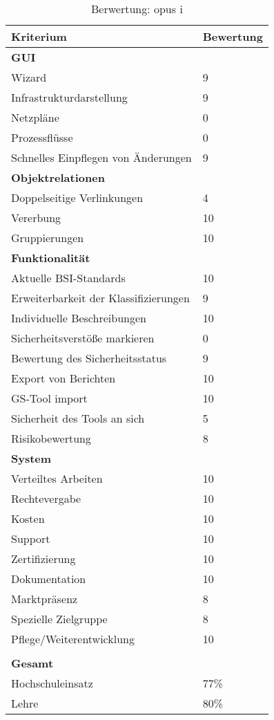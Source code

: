 \begin{table}[h!tb]
	\begin{tabular}{|p{}|p{}|}
		\hline 
		Kriterium & Bewertung\\ 
		\hline 
		\textbf{GUI}& \\
		\hline
		Wizard & 9\\
		\hline 
		Infrastrukturdarstellung & 9 \\
		\hline 
		Netzpläne & 0 \\
		\hline 
		Prozessflüsse & 0 \\
		\hline 
		Schnelles Einpflegen von Änderungen & 9 \\
		\hline
		\textbf{Objektrelationen} & \\
		\hline 
		Doppelseitige Verlinkungen & 4 \\
		\hline 
		Vererbung & 10 \\
		\hline 
		Gruppierungen & 10 \\
		\hline 
		\textbf{Funktionalität} &\\
		\hline 
		Aktuelle BSI-Standards & 10 \\
		\hline  
		Erweiterbarkeit der Klassifizierungen & 9 \\
		\hline 
		Individuelle Beschreibungen & 10 \\
		\hline 
		Sicherheitsverstöße markieren & 0 \\
		\hline
		Bewertung des Sicherheitsstatus & 9 \\
		\hline
		Export von Berichten & 10 \\
		\hline
		GS-Tool import & 10 \\
		\hline
		Sicherheit des Tools an sich & 5 \\
		\hline
		Risikobewertung & 8 \\
		\hline
		\textbf{System}&  \\
		\hline
		Verteiltes Arbeiten & 10 \\
		\hline
		Rechtevergabe & 10 \\
		\hline
		Kosten & 10 \\
		\hline
		Support & 10 \\
		\hline
		Zertifizierung & 10 \\
		\hline
		Dokumentation & 10 \\
		\hline
		Marktpräsenz & 8 \\
		\hline
		Spezielle Zielgruppe & 8 \\
		\hline
		Pflege/Weiterentwicklung & 10 \\
		\hline
		\multicolumn{2}{c}{}\\
		\hline
		\textbf{Gesamt} & \\
		\hline
		Hochschuleinsatz & 77\%\\
		\hline
		Lehre & 80\%\\
		\hline
	\end{tabular} 
	\caption{Berwertung: opus i}
	\label{tab:Berwertungopusi}
\end{table}
